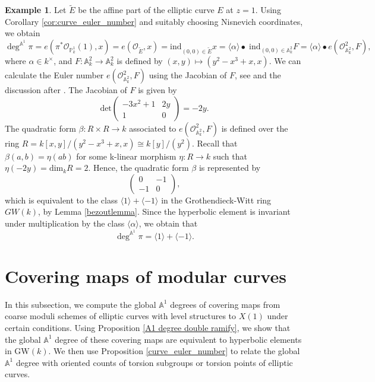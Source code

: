 \documentclass[12pt, reqno]{amsart}
\theoremstyle{definition}
\newtheorem{example}[theorem]{Example}
\newcommand{\A}{\mathbb{A}} %
\newcommand{\Proj}{\mathbb{P}} %
\newcommand{\GW}{\mathrm{GW}} %
\newcommand{\Adeg}{\deg^{\mathbb{A}^1}} %
\newcommand{\Oh}{\mathscr{O}} %
\newcommand{\ind}{\mathrm{ind}} %
\begin{document}
\begin{example}
Let $\tilde{E}$ be the affine part of the elliptic curve $E$ at $z = 1$.
Using Corollary \ref{cor:curve_euler_number} and suitably choosing Nisnevich coordinates, we obtain
\begin{equation*}
    \Adeg \pi = e(\pi^* \Oh_{\Proj^1_k}(1), x) = e(\Oh_{\tilde{E}}, x) = \ind_{(0,0) \in \tilde{E}} x = \langle \alpha \rangle \bullet \; \ind_{(0,0) \in \A^2_k} F = \langle \alpha \rangle \bullet e(\Oh_{\A^2_k}^2, F),
\end{equation*}
where $\alpha \in k^\times$, and $F: \A^2_k \to \A^2_k$ is defined by $(x,y) \mapsto (y^2 - x^3 + x, x)$. We can calculate the Euler number $e(\Oh^2_{\A^2_k}, F)$ using the Jacobian of $F$, see \cite[Proposition 15]{kwEKL} and the discussion after \cite[Corollary 31]{kwcubic}. The Jacobian of $F$ is given by
\begin{equation*}
    \text{det} \begin{pmatrix} -3x^2 + 1 & 2y \\ 1 & 0 \end{pmatrix} = -2y.
\end{equation*}
The quadratic form $\beta: R \times R \to k$ associated to $e(\Oh^2_{\A^2_k}, F)$ is defined over the ring $R = k[x,y]/(y^2 - x^3 + x, x) \cong k[y]/(y^2)$. Recall that $\beta(a,b) = \eta(ab)$ for some k-linear morphism $\eta: R \to k$ such that $\eta(-2y) = \text{dim}_k R = 2$. Hence, the quadratic form $\beta$ is represented by
\begin{equation*}
    \begin{pmatrix} 0 & -1 \\ -1 & 0 \end{pmatrix},
\end{equation*}
which is equivalent to the class $\langle 1 \rangle + \langle -1 \rangle$ in the Grothendieck-Witt ring $GW(k)$, by Lemma \ref{bezoutlemma}. Since the hyperbolic element is invariant under multiplication by the class $\langle \alpha \rangle$, we obtain that
\begin{equation*}
    \Adeg \pi = \langle 1 \rangle + \langle -1 \rangle .
\end{equation*}
\end{example}

\section{Covering maps of modular curves} \label{sec: covering maps}

In this subsection, we compute the global $\A^1$ degrees of covering maps from coarse moduli schemes of elliptic curves with level structures to $X(1)$ under certain conditions. Using Proposition \ref{A1 degree double ramify}, we show that the global $\A^1$ degree of these covering maps are equivalent to hyperbolic elements in $\GW(k)$. We then use Proposition \ref{curve_euler_number} to relate the global $\A^1$ degree with oriented counts of torsion subgroups or torsion points of elliptic curves.
\end{document}
